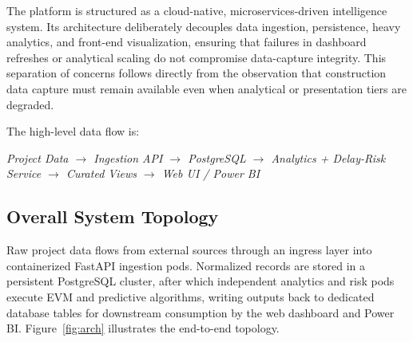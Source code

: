 \documentclass[conference]{IEEEtran}
\begin{document}
The platform is structured as a cloud-native, microservices-driven intelligence system. Its architecture deliberately decouples data ingestion, persistence, heavy analytics, and front-end visualization, ensuring that failures in dashboard refreshes or analytical scaling do not compromise data-capture integrity. This separation of concerns follows directly from the observation that construction data capture must remain available even when analytical or presentation tiers are degraded.

The high-level data flow is:
\begin{center}
\emph{Project Data $\rightarrow$ Ingestion API $\rightarrow$ PostgreSQL $\rightarrow$ Analytics + Delay-Risk Service $\rightarrow$ Curated Views $\rightarrow$ Web UI / Power BI}
\end{center}

\subsection{Overall System Topology}

Raw project data flows from external sources through an ingress layer into containerized FastAPI ingestion pods. Normalized records are stored in a persistent PostgreSQL cluster, after which independent analytics and risk pods execute EVM and predictive algorithms, writing outputs back to dedicated database tables for downstream consumption by the web dashboard and Power BI. Figure~\ref{fig:arch} illustrates the end-to-end topology.
\end{document}
